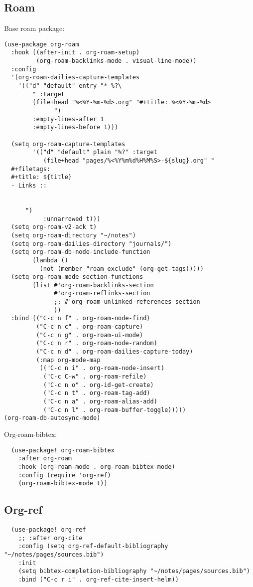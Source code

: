 \documentclass[11pt]{article}
\begin{document}
\subsection{Roam}
\label{sec:org4b9b90b}
Base roam package:
\begin{verbatim}
(use-package org-roam
  :hook ((after-init . org-roam-setup)
         (org-roam-backlinks-mode . visual-line-mode))
  :config
  '(org-roam-dailies-capture-templates
    '(("d" "default" entry "* %?\
        " :target
        (file+head "%<%Y-%m-%d>.org" "#+title: %<%Y-%m-%d>
              ")
        :empty-lines-after 1
        :empty-lines-before 1)))

  (setq org-roam-capture-templates
        '(("d" "default" plain "%?" :target
           (file+head "pages/%<%Y%m%d%H%M%S>-${slug}.org" "
  #+filetags:
  #+title: ${title}
  - Links ::


      ")
           :unnarrowed t)))
  (setq org-roam-v2-ack t)
  (setq org-roam-directory "~/notes")
  (setq org-roam-dailies-directory "journals/")
  (setq org-roam-db-node-include-function
        (lambda ()
          (not (member "roam_exclude" (org-get-tags)))))
  (setq org-roam-mode-section-functions
        (list #'org-roam-backlinks-section
              #'org-roam-reflinks-section
              ;; #'org-roam-unlinked-references-section
              ))
  :bind (("C-c n f" . org-roam-node-find)
         ("C-c n c" . org-roam-capture)
         ("C-c n g" . org-roam-ui-mode)
         ("C-c n r" . org-roam-node-random)
         ("C-c n d" . org-roam-dailies-capture-today)
         (:map org-mode-map
          (("C-c n i" . org-roam-node-insert)
           ("C-c C-w" . org-roam-refile)
           ("C-c n o" . org-id-get-create)
           ("C-c n t" . org-roam-tag-add)
           ("C-c n a" . org-roam-alias-add)
           ("C-c n l" . org-roam-buffer-toggle)))))
(org-roam-db-autosync-mode)
\end{verbatim}

Org-roam-bibtex:
\begin{verbatim}
  (use-package! org-roam-bibtex
    :after org-roam
    :hook (org-roam-mode . org-roam-bibtex-mode)
    :config (require 'org-ref)
    (org-roam-bibtex-mode t))
\end{verbatim}

\subsection{Org-ref}
\label{sec:org9b9496f}
\begin{verbatim}
  (use-package! org-ref
    ;; :after org-cite
    :config (setq org-ref-default-bibliography "~/notes/pages/sources.bib")
    :init
    (setq bibtex-completion-bibliography "~/notes/pages/sources.bib")
    :bind ("C-c r i" . org-ref-cite-insert-helm))
\end{verbatim}
\end{document}
